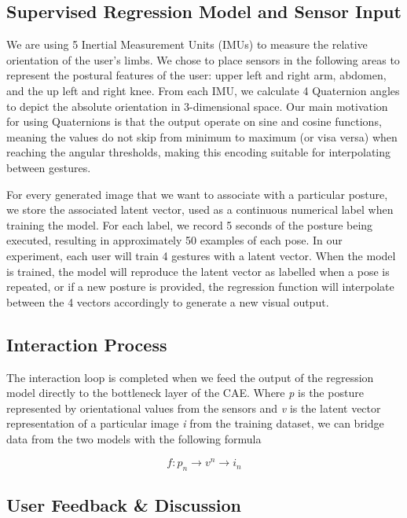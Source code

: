 \subsection{Supervised Regression Model and Sensor Input}\label{sensor_input}

We are using {5} Inertial Measurement Units (IMUs) to measure the relative orientation of the user’s limbs. We chose to place sensors in the following areas to represent the postural features of the user: {upper left and right arm, abdomen, and the up left and right knee}. From each IMU, we calculate 4 Quaternion angles to depict the  absolute orientation in 3-dimensional space. Our main motivation for using Quaternions is that the output operate on sine and cosine functions, meaning the values do not skip from minimum to maximum (or visa versa) when reaching the angular thresholds, making this encoding suitable for interpolating between gestures.

For every generated image that we want to associate with a particular posture, we store the associated latent vector, used as a continuous numerical label when training the model. For each label, we record 5 seconds of the posture being executed, resulting in approximately 50 examples of each pose. In our experiment, each user will train 4 gestures with a latent vector. When the model is trained, the model will reproduce the latent vector as labelled when a pose is repeated, or if a new posture is provided, the regression function will interpolate between the 4 vectors accordingly to generate a new visual output.

\subsection{Interaction Process}

The interaction loop is completed when we feed the output of the regression model directly to the bottleneck layer of the CAE. Where \textit{p} is the posture represented by orientational values from the sensors and \textit{v} is the latent vector representation of a particular image \textit{i} from the training dataset, we can bridge data from the two models with the following formula

\[ f:p_n\xrightarrow{}v^n \xrightarrow{}i_n \]

\subsection{User Feedback \& Discussion}

